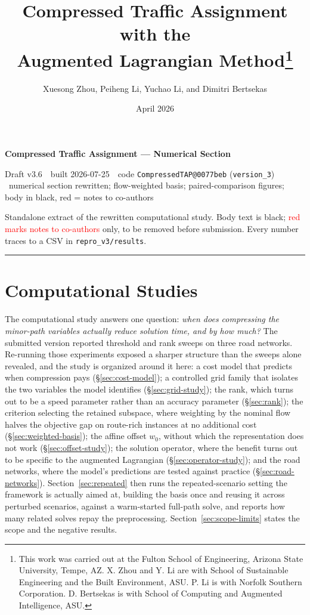 \documentclass[11pt]{article}
\title{Compressed Traffic Assignment with the \\Augmented Lagrangian Method\footnote{
This work was carried out at the Fulton School of Engineering, Arizona State University, Tempe, AZ. X. Zhou and Y. Li are with School of Sustainable Engineering and the Built Environment, ASU. P. Li is with Norfolk Southern Corporation. D. Bertsekas is with School of Computing and Augmented Intelligence, ASU.}}
\author{Xuesong Zhou, Peiheng Li, Yuchao Li, and Dimitri Bertsekas}
\date{April 2026}
\makeatletter
\newcommand{\docver}{v3.6}
\newcommand{\docdate}{2026-07-25}
\newcommand{\doccommit}{0077beb}
\newcommand{\docstamp}{Draft \docver\ \textbullet\ built \docdate\ \textbullet\ code
  \texttt{CompressedTAP@\doccommit} (\texttt{version\_3}) \textbullet\ numerical section
  rewritten; flow-weighted basis; paired-comparison figures; body in black, red = notes to co-authors}
\newif\ifshownotes \shownotesfalse
\newcommand{\conote}[1]{\ifshownotes{\color{red}\small\textsf{[Note to co-authors: #1]}}\fi}
\makeatother
\begin{document}
{\Large\bfseries Compressed Traffic Assignment --- Numerical Section}\par
\vspace{3pt}
{\small\textsf{\docstamp}}\par
\vspace{3pt}
{\small Standalone extract of the rewritten computational study. Body text is black;
\textcolor{red}{red marks notes to co-authors} only, to be removed before submission.
Every number traces to a CSV in \texttt{repro\_v3/results}.}
\vspace{8pt}\hrule\vspace{8pt}
\section{Computational Studies}
\label{sec:experiments}
\label{sec:experiments}\label{sec:computational}


The computational study answers one question: \emph{when does compressing the minor-path
variables actually reduce solution time, and by how much?} The submitted version reported
threshold and rank sweeps on three road networks. Re-running those experiments exposed a
sharper structure than the sweeps alone revealed, and the study is organized around it here:
a cost model that predicts when compression pays (\S\ref{sec:cost-model}); a controlled grid
family that isolates the two variables the model identifies (\S\ref{sec:grid-study}); the
rank, which turns out to be a speed parameter rather than an accuracy parameter
(\S\ref{sec:rank}); the criterion selecting the retained subspace, where weighting by the
nominal flow halves the objective gap on route-rich instances at no additional cost
(\S\ref{sec:weighted-basis}); the affine offset $w_0$, without which the representation does not work
(\S\ref{sec:offset-study}); the solution operator, where the benefit turns out to be specific
to the augmented Lagrangian (\S\ref{sec:operator-study}); and the road networks, where the
model's predictions are tested against practice (\S\ref{sec:road-networks}).
Section~\ref{sec:repeated} then runs the repeated-scenario setting the framework is actually
aimed at, building the basis once and reusing it across perturbed scenarios, against a
warm-started full-path solve, and reports how many related solves repay the preprocessing.
Section~\ref{sec:scope-limits} states the scope and the negative results.

\conote{This section is a full rewrite rather than an update of the submitted one, so it is
set in black and red is reserved for these notes. The organizing change is that it leads with
a cost model and then tests it, instead of reporting parameter sweeps. Referee~1's own
diagnosis --- that the dense $(n-s)\times r$ nonnegativity block caps the gain --- is exactly
what the model formalizes, which is deliberate.}
\end{document}
